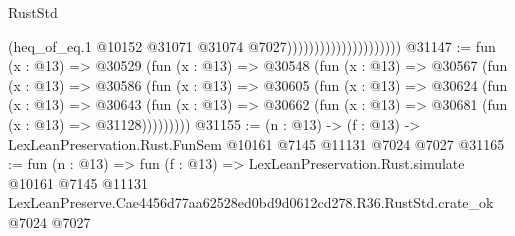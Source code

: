 \begin{lexlean}{RustStd}
\begin{coremodule}
                                            (heq_of_eq.{1}
                                              @10152
                                              @31071
                                              @31074
                                              @7027)))))))))))))))))))))
@31147 := fun (x : @13) =>
  @30529
    (fun (x : @13) =>
    @30548
      (fun (x : @13) =>
      @30567
        (fun (x : @13) =>
        @30586
          (fun (x : @13) =>
          @30605
            (fun (x : @13) =>
            @30624
              (fun (x : @13) =>
              @30643
                (fun (x : @13) => @30662 (fun (x : @13) => @30681 (fun (x : @13) => @31128)))))))))
@31155 := (n : @13) -> (f : @13) -> LexLeanPreservation.Rust.FunSem @10161 @7145 @11131 @7024 @7027
@31165 := fun (n : @13) =>
  fun (f : @13) =>
  LexLeanPreservation.Rust.simulate
    @10161
    @7145
    @11131
    LexLeanPreserve.Cae4456d77aa62528ed0bd9d0612cd278.R36.RustStd.crate_ok
    @7024
    @7027
\end{coremodule}
\end{lexlean}
